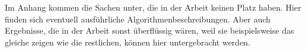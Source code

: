 
Im Anhang kommen die Sachen unter, die in der Arbeit keinen Platz haben. Hier finden sich eventuell ausführliche Algorithmenbeschreibungen. Aber auch Ergebnisse, die in der Arbeit sonst überflüssig wären, weil sie beispielsweise das gleiche zeigen wie die restlichen, können hier untergebracht werden.
